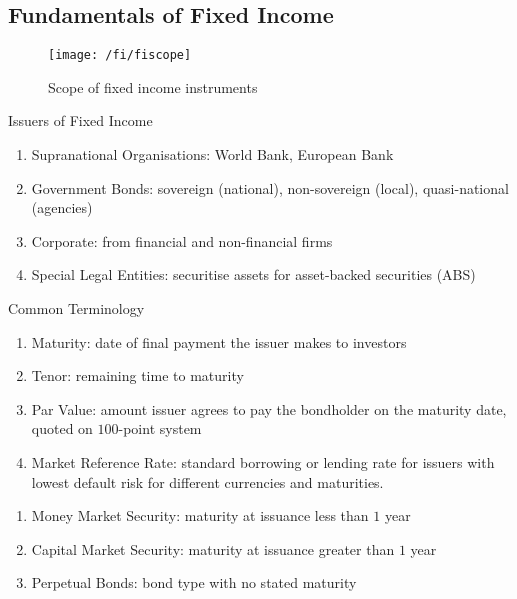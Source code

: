 \subsection{Fundamentals of Fixed Income}

\begin{figure}[H]
\centering
\texttt{[image: /fi/fiscope]}
\caption{Scope of fixed income instruments}
\end{figure}

\begin{remark} Issuers of Fixed Income
\begin{enumerate}[label=\roman*.]
\setlength{\itemsep}{0pt}
\item Supranational Organisations: World Bank, European Bank
\item Government Bonds: sovereign (national), non-sovereign (local), quasi-national (agencies)
\item Corporate: from financial and non-financial firms
\item Special Legal Entities: securitise assets for asset-backed securities (ABS)
\end{enumerate}
\end{remark}

\begin{remark} Common Terminology
\begin{enumerate}[label=\roman*.]
\setlength{\itemsep}{0pt}
\item Maturity: date of final payment the issuer makes to investors
\item Tenor: remaining time to maturity
\item Par Value: amount issuer agrees to pay the bondholder on the maturity date, quoted on $100$-point system
\item Market Reference Rate: standard borrowing or lending rate for issuers with lowest default risk for different currencies and maturities.
\end{enumerate}
\end{remark}

\begin{remark} 
\begin{enumerate}[label=\roman*.]
\setlength{\itemsep}{0pt}
\item Money Market Security: maturity at issuance less than $1$ year
\item Capital Market Security: maturity at issuance greater than $1$ year
\item Perpetual Bonds: bond type with no stated maturity
\end{enumerate}
\end{remark}

